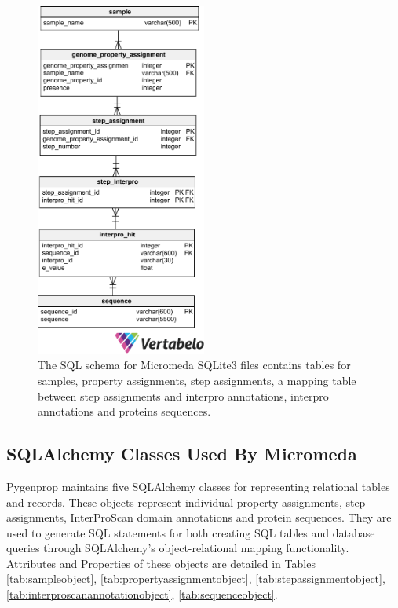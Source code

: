 \begin{figure}[!ht]
  \centering
	\includegraphics[width=0.50\textwidth]{media/micromeda_schema.pdf}
	 \caption{The SQL schema for Micromeda SQLite3 files contains tables for samples, property assignments, step assignments, a mapping table between step assignments and interpro annotations, interpro annotations and proteins sequences.}
	 \label{fig:micromedaschema}
\end{figure}

\subsection{SQLAlchemy Classes Used By Micromeda} \label{sqlalchemy-classes}

Pygenprop maintains five SQLAlchemy classes for representing relational tables and records. These objects represent individual property assignments, step assignments, InterProScan domain annotations and protein sequences. They are used to generate SQL statements for both creating SQL tables and database queries through SQLAlchemy's object-relational mapping functionality. Attributes and Properties of these objects are detailed in Tables \ref{tab:sampleobject}, \ref{tab:propertyassignmentobject}, \ref{tab:stepassignmentobject}, \ref{tab:interproscanannotationobject}, \ref{tab:sequenceobject}.

